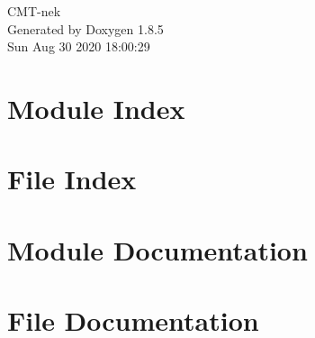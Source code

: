 \documentclass[twoside]{book}
\newcommand{\clearemptydoublepage}{%
  \newpage{\pagestyle{empty}\cleardoublepage}%
}
\begin{document}
\hypersetup{pageanchor=false}
\begin{titlepage}
\vspace*{7cm}
\begin{center}%
{\Large C\-M\-T-\/nek }\\
\vspace*{1cm}
{\large Generated by Doxygen 1.8.5}\\
\vspace*{0.5cm}
{\small Sun Aug 30 2020 18:00:29}\\
\end{center}
\end{titlepage}
\clearemptydoublepage
\tableofcontents
\clearemptydoublepage
{}
\hypersetup{pageanchor=true}


\chapter{Module Index}

\chapter{File Index}

\chapter{Module Documentation}











\chapter{File Documentation}














\newpage
{}
{}
\printindex
\end{document}
